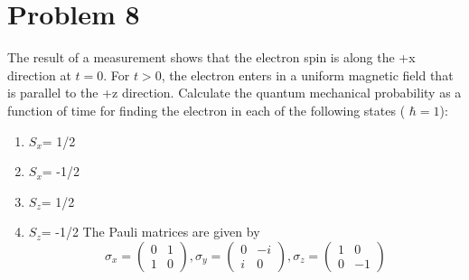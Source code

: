 \documentclass{article}
\begin{document}
\section*{Problem 8} 
The result of a measurement shows that the electron spin is along the +x direction at $t=0$. For $t > 0$, the electron enters in a uniform magnetic field that is parallel to the +z direction. Calculate the quantum mechanical probability as a function of time for finding the electron in each of the following states ( $\hbar = 1$):
\begin{enumerate}[label=\alph*)]
	\item %
	$S_x$= 1/2
	\item %
	$S_x$= -1/2
	\item %
	$S_z$= 1/2
	\item %
	$S_z$= -1/2
The Pauli matrices are given by
\[
\sigma_x = \begin{pmatrix} 0 & 1 \\ 1 & 0 \end{pmatrix}, \sigma_y = \begin{pmatrix} 0 & -i \\ i & 0 \end{pmatrix}, \sigma_z = \begin{pmatrix} 1 & 0 \\ 0 & -1 \end{pmatrix}
\]
\end{enumerate}
\end{document}
